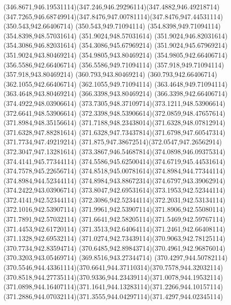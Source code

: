 {{	\curveto(346.8671,946.19531114)(347.246,946.29296114)(347.4882,946.49218714)
	\curveto(347.7265,946.68749914)(347.8476,947.00781114)(347.8476,947.44531114)
	\closepath
	\moveto(350.543,942.66406714)
	\lineto(350.543,949.71094114)
	\lineto(354.8398,949.71094114)
	\lineto(354.8398,948.57031614)
	\lineto(351.9024,948.57031614)
	\lineto(351.9024,946.82031614)
	\lineto(354.3086,946.82031614)
	\lineto(354.3086,945.67969214)
	\lineto(351.9024,945.67969214)
	\lineto(351.9024,943.80469214)
	\lineto(354.9805,943.80469214)
	\lineto(354.9805,942.66406714)
	\closepath
	\moveto(356.5586,942.66406714)
	\lineto(356.5586,949.71094114)
	\lineto(357.918,949.71094114)
	\lineto(357.918,943.80469214)
	\lineto(360.793,943.80469214)
	\lineto(360.793,942.66406714)
	\closepath
	\moveto(362.1055,942.66406714)
	\lineto(362.1055,949.71094114)
	\lineto(363.4648,949.71094114)
	\lineto(363.4648,943.80469214)
	\lineto(366.3398,943.80469214)
	\lineto(366.3398,942.66406714)
	\closepath
	\moveto(374.4922,948.03906614)
	\curveto(373.7305,948.37109714)(373.1211,948.53906614)(372.6641,948.53906614)
	\curveto(372.3398,948.53906614)(372.0859,948.47657614)(371.8984,948.35156614)
	\curveto(371.7188,948.23438014)(371.6328,948.07812914)(371.6328,947.88281614)
	\curveto(371.6328,947.73437814)(371.6798,947.60547314)(371.7734,947.49219214)
	\curveto(371.875,947.38672514)(372.0547,947.26562914)(372.3047,947.13281614)
	\curveto(373.3867,946.54687814)(374.0898,946.09375314)(374.4141,945.77344114)
	\curveto(374.5586,945.62500414)(374.6719,945.44531614)(374.7578,945.22656714)
	\curveto(374.8518,945.00781614)(374.8984,944.77344114)(374.8984,944.52344114)
	\curveto(374.8984,943.88672314)(374.6797,943.39062914)(374.2422,943.03906714)
	\curveto(373.8047,942.69531614)(373.1953,942.52344114)(372.4141,942.52344114)
	\curveto(372.3086,942.52344114)(372.2031,942.53134114)(372.1016,942.53907114)
	\curveto(371.9961,942.53907114)(371.8906,942.55080114)(371.7891,942.57032114)
	\curveto(371.6641,942.58205114)(371.5469,942.59767114)(371.4453,942.61720114)
	\curveto(371.3513,942.64064114)(371.2461,942.66408114)(371.1328,942.69532114)
	\curveto(371.0274,942.73439114)(370.9063,942.78125114)(370.7734,942.83594714)
	\curveto(370.6485,942.89843714)(370.4961,942.96876014)(370.3203,943.05469714)
	\lineto(369.8516,943.27344714)
	\lineto(370.4297,944.50782114)
	\curveto(370.5546,944.43361114)(370.6641,944.37110314)(370.7578,944.32032114)
	\curveto(370.8518,944.27735114)(370.9336,944.23439114)(371.0078,944.19532114)
	\curveto(371.0898,944.16407114)(371.1641,944.13283114)(371.2266,944.10157114)
	\curveto(371.2886,944.07032114)(371.3555,944.04297114)(371.4297,944.02345114)
}}
